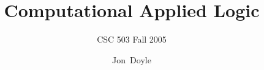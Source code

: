 
{

}

\usepackage[english]{babel}
\usepackage[latin1]{inputenc}
\usepackage{times}
\usepackage[T1]{fontenc}


\title[CSC 503 Fall 2005] %
{Computational Applied Logic}

\subtitle{CSC 503 Fall 2005} %

\author[Jon Doyle] %
{Jon~Doyle}


\def\insertcopyright{$\copyright$ 2005 by Jon Doyle}
\def\insertslideinfo{\insertshorttitle}

\subject{Computational Applied Logic}










